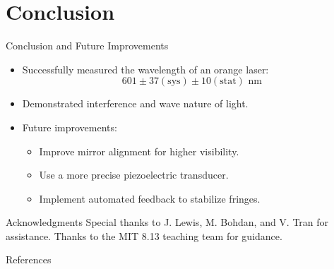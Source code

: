 \documentclass[aspectratio = 169]{beamer}
\begin{document}
\section{Conclusion}
\begin{frame}{Conclusion and Future Improvements}
    \begin{itemize}
        \item Successfully measured the wavelength of an orange laser:
        \[
        601\pm37(\text{sys})\pm10(\text{stat})\text{ nm}
        \]
        \item Demonstrated interference and wave nature of light.
        \item Future improvements:
        \begin{itemize}
            \item Improve mirror alignment for higher visibility.
            \item Use a more precise piezoelectric transducer.
            \item Implement automated feedback to stabilize fringes.
        \end{itemize}
    \end{itemize}
\end{frame}

\begin{frame}{Acknowledgments}
Special thanks to J. Lewis, M. Bohdan, and V. Tran for assistance. Thanks to the MIT 8.13 teaching team for guidance. 
\end{frame}

\begin{frame}[allowframebreaks]{References}
    
    
\end{frame}
\end{document}
